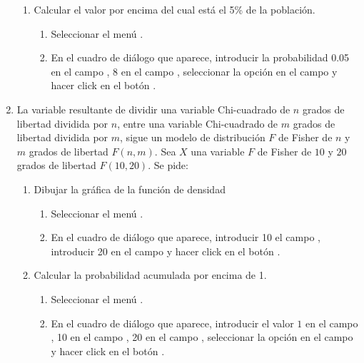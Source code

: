 \begin{enumerate}[leftmargin=*]
\begin{enumerate}
\item Calcular el valor por encima del cual está el 5\% de la población. 
\begin{indicacion}{
\begin{enumerate}
\item Seleccionar el menú .
\item En el cuadro de diálogo que aparece, introducir la probabilidad 0.05 en el campo , 8 en el
campo , seleccionar la opción  en el campo  y hacer
click en el botón .
\end{enumerate}}
\end{indicacion}
\end{enumerate}

\item La variable resultante de dividir una variable Chi-cuadrado de $n$ grados de libertad dividida por $n$, entre una
variable Chi-cuadrado de $m$ grados de libertad dividida por $m$, sigue un modelo de distribución $F$ de Fisher de $n$ y
$m$ grados de libertad $F(n,m)$. 
Sea $X$ una variable $F$ de Fisher de $10$ y $20$ grados de libertad $F(10,20)$. 
Se pide:
\begin{enumerate}
\item Dibujar la gráfica de la función de densidad
\begin{indicacion}{
\begin{enumerate}
\item Seleccionar el menú .
\item En el cuadro de diálogo que aparece, introducir 10 el campo , introducir 20 en el campo  y hacer click en el botón .
\end{enumerate}}
\end{indicacion}

\item Calcular la probabilidad acumulada por encima de 1. 
\begin{indicacion}{
\begin{enumerate}
\item Seleccionar el menú .
\item En el cuadro de diálogo que aparece, introducir el valor $1$ en el campo , 10 en el
campo , 20 en el campo , seleccionar
la opción  en el campo  y hacer click en el botón .
\end{enumerate}}
\end{indicacion}


\end{enumerate}
\end{enumerate}

